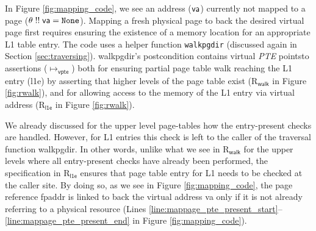 In Figure \ref{fig:mapping_code}, we see an address ($\mathsf{va}$) currently not
mapped to a page ($\theta \; !!\; \mathsf{va} = \texttt{None}$). Mapping a fresh
physical page to back the desired virtual page first requires ensuring
the existence of a memory location for an appropriate L1 table entry.
The code uses a helper function \lstinline{walkpgdir} (discussed again in Section \ref{sec:traversing}).
\textsf{walkpgdir}'s postcondition contains virtual \emph{PTE} pointsto assertions ($\mapsto_{\textsf{vpte}}$)
both for ensuring partial page table walk reaching the
L1 entry (l1e) by asserting that higher levels of the page table exist (R$_{\textsf{walk}}$ in Figure \ref{fig:rwalk}), 
and for allowing access to the memory of the L1 entry via virtual address (R$_{\textsf{l1e}}$ in Figure \ref{fig:rwalk}).




We already discussed for the upper level page-tables how the entry-present checks are handled.
However, for L1 entries this check is left to the caller of the 
traversal function \textsf{walkpgdir}. In other words, unlike what we see in R$_{\textsf{walk}}$ for the upper levels where all entry-present
checks have already been performed, the specification in R$_{\textsf{l1e}}$ ensures that page table entry for L1 needs to be checked at the caller site. 
By doing so, as we see in Figure \ref{fig:mapping_code}, the page reference \textsf{fpaddr} is linked to back the virtual address \textsf{va} 
only if it is not already referring to a physical resource (Lines \ref{line:mappage_pte_present_start}--\ref{line:mappage_pte_present_end} in Figure \ref{fig:mapping_code}). 

